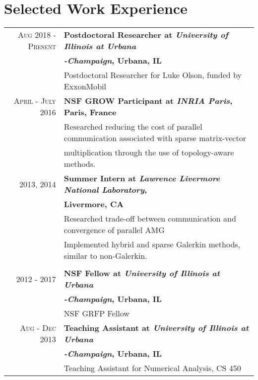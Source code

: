 \documentclass[a4paper,10pt]{article} %
\begin{document}
\section{Selected Work Experience}

\begin{longtable}{rl}

\textsc{Aug 2018 - Present} 
    &\textbf{Postdoctoral Researcher at \emph{University of Illinois at Urbana}}\\
    &\textbf{\emph{-Champaign}, Urbana, IL}\\
& \footnotesize{Postdoctoral Researcher for Luke Olson, funded by ExxonMobil}\\


\textsc{April - July 2016} 
    &\textbf{NSF GROW Participant at \emph{INRIA Paris}, Paris, France}\\
    &\footnotesize{Researched reducing the cost of parallel communication
    associated with sparse matrix-vector}\\
    &\footnotesize{multiplication through the use of
    topology-aware methods.}\\


\textsc{2013, 2014} 
    &\textbf{Summer Intern at \emph{Lawrence Livermore National Laboratory},}\\
    &\textbf{Livermore, CA}\\
    &\footnotesize{Researched trade-off between communication and
    convergence of parallel AMG}\\
    &\footnotesize{Implemented hybrid and sparse Galerkin methods, similar to
    non-Galerkin.}\\


    \\
\textsc{2012 - 2017} 
    &\textbf{NSF Fellow at \emph{University of Illinois at Urbana}}\\
    &\textbf{\emph{-Champaign}, Urbana, IL}\\
& \footnotesize{NSF GRFP Fellow}\\


\textsc{Aug - Dec 2013} 
    &\textbf{Teaching Assistant at \emph{University of Illinois at Urbana}}\\
    &\textbf{\emph{-Champaign}, Urbana, IL}\\
& \footnotesize{Teaching Assistant for Numerical Analysis, CS 450 }\\


\end{longtable}
\end{document}
